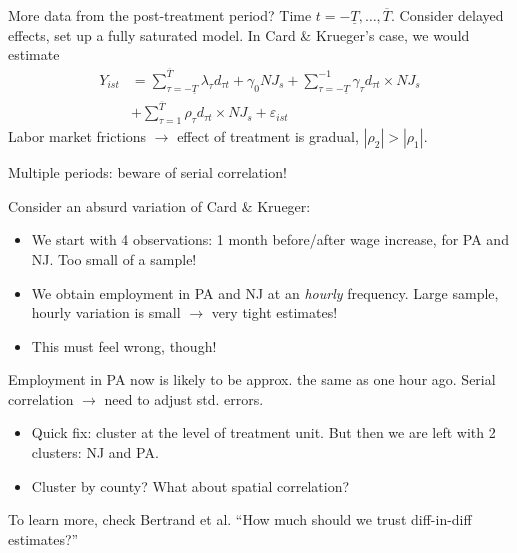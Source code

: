 \documentclass[notes=show,beamer,compress]{beamer}
\begin{document}
\begin{frame}{More data from the post-treatment period?}
Time $t=-\underline{T},\dots, \overline{T}$. Consider delayed effects, set up a fully saturated model. In Card \& Krueger's case, we would estimate
\begin{align*}
Y_{ist} &= \sum_{\tau=-\underline{T}}^{\overline{T}}\lambda_\tau{}d_{\tau t} + \gamma_0NJ_s +  \sum_{\tau=-\underline{T}}^{-1}\gamma_\tau d_{\tau t}\times{}NJ_s\\
&+ \sum_{\tau=1}^{\overline{T}}\rho_\tau d_{\tau t}\times{}NJ_s + \varepsilon_{ist}
\end{align*}
Labor market frictions $\to$ effect of treatment is gradual, $|\rho_2|>|\rho_1|$.
\end{frame}

\begin{frame}{Multiple periods: beware of serial correlation!}

Consider an absurd variation of Card \& Krueger:
\begin{itemize}
	\item{We start with 4 observations: 1 month before/after wage increase, for PA and NJ. Too small of a sample!}
	\item{We obtain employment in PA and NJ at an \emph{hourly} frequency. Large sample, hourly variation is small $\to$ very tight estimates!}
	\item{This must feel wrong, though!}
\end{itemize}
Employment in PA now is likely to be approx. the same as one hour ago. Serial correlation $\rightarrow$ need to adjust std. errors.
\begin{itemize}
	\item{Quick fix: cluster at the level of treatment unit. But then we are left with 2 clusters: NJ and PA.}
	\item{Cluster by county? What about spatial correlation?}
\end{itemize}
To learn more, check Bertrand et al. ``How much should we trust diff-in-diff estimates?''
\end{frame}
\end{document}
